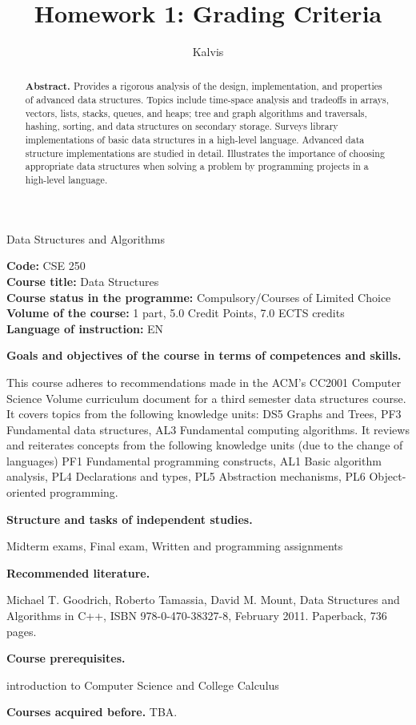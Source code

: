 \documentclass[jou]{apa6}
\title{Homework 1: Grading Criteria}
\author{Kalvis}
\affiliation{RBS}
\begin{document}
\thispagestyle{empty}


\begin{center}
{\Large Data Structures and Algorithms}
\end{center}


{\bf Code: } CSE 250\\
{\bf Course title: } Data Structures\\
{\bf Course status in the programme:} Compulsory/Courses of Limited Choice\\
{\bf Volume of the course:} 1 part, 5.0 Credit Points, 7.0 ECTS credits\\
{\bf Language of instruction:} EN



\begin{abstract}
{\bf Abstract.} Provides a rigorous analysis of the design, implementation, and properties of advanced data structures. Topics include time-space analysis and tradeoffs in arrays, vectors, lists, stacks, queues, and heaps; tree and graph algorithms and traversals, hashing, sorting, and data structures on secondary storage. Surveys library implementations of basic data structures in a high-level language. Advanced data structure implementations are studied in detail. Illustrates the importance of choosing appropriate data structures when solving a problem by programming projects in a high-level language.
\end{abstract}


{\bf Goals and objectives of the course in terms of competences and skills.} 

This course adheres to recommendations made in the ACM's CC2001 Computer Science Volume curriculum document for a third semester data structures course. It covers topics from the following knowledge units: DS5 Graphs and Trees, PF3 Fundamental data structures, AL3 Fundamental computing algorithms. It reviews and reiterates concepts from the following knowledge units (due to the change of languages) PF1 Fundamental programming constructs, AL1 Basic algorithm analysis, PL4 Declarations and types, PL5 Abstraction mechanisms, PL6 Object-oriented programming.

{\bf Structure and tasks of independent studies.} 

Midterm exams, Final exam, Written and programming assignments

{\bf Recommended literature.}

Michael T. Goodrich, Roberto Tamassia, David M. Mount, Data Structures and Algorithms in C++, ISBN 978-0-470-38327-8, February 2011. Paperback, 736 pages.

{\bf Course prerequisites.}

introduction to Computer Science and College Calculus

{\bf Courses acquired before.} TBA.
\end{document}
